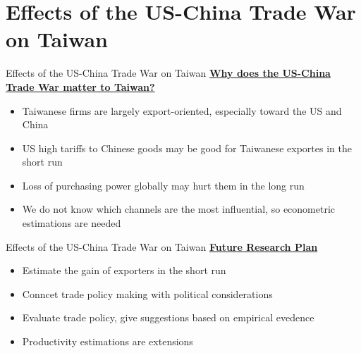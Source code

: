 \documentclass{beamer}
\begin{document}
\section{Effects of the US-China Trade War on Taiwan}
\begin{frame}{Effects of the US-China Trade War on Taiwan}
\underline{\textbf{Why does the US-China Trade War matter to Taiwan?}}
\begin{itemize}
    \item Taiwanese firms are largely {\color{red}export-oriented}, especially toward the US and China
    \item US high tariffs to Chinese goods may be {\color{red}good for Taiwanese exportes in the short run}
    \item {\color{red}Loss of purchasing power globally} may hurt them in the long run
    \item We do not know which channels are the most influential, so {\color{red}econometric estimations} are needed
\end{itemize}
\end{frame}

\begin{frame}{Effects of the US-China Trade War on Taiwan}
    \underline{\textbf{Future Research Plan}}
    \begin{itemize}
        \item Estimate the gain of exporters in the short run
        \item Conncet trade policy making with {\color{red}political} considerations
        \item Evaluate trade policy, give suggestions based on empirical evedence
        \item Productivity estimations are extensions
    \end{itemize}
\end{frame}
\end{document}
